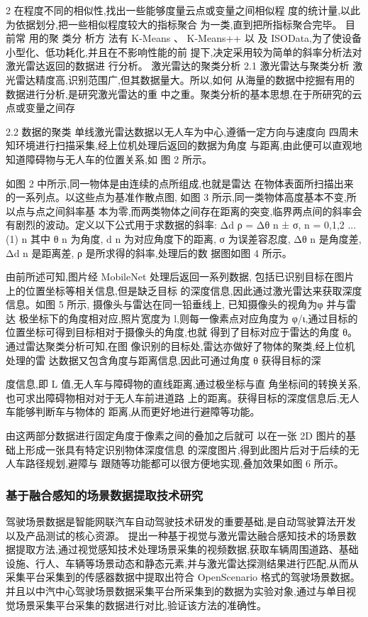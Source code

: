 \message{ !name(\unexpanded{数据融合}.tex)}\documentclass{amsart}
\begin{document}
2
在程度不同的相似性,找出一些能够度量云点或变量之间相似程
度的统计量,以此为依据划分,把一些相似程度较大的指标聚合
为一类,直到把所指标聚合完毕。
目 前常 用的聚 类分 析方 法有 K-Means 、 K-Means++ 以 及
ISOData,为了使设备小型化、低功耗化,并且在不影响性能的前
提下,决定采用较为简单的斜率分析法对激光雷达返回的数据进
行分析。
激光雷达的聚类分析
2.1 激光雷达与聚类分析
激光雷达精度高,识别范围广,但其数据量大。所以,如何
从海量的数据中挖掘有用的数据进行分析,是研究激光雷达的重
中之重。聚类分析的基本思想,在于所研究的云点或变量之间存

2.2 数据的聚类
单线激光雷达数据以无人车为中心,遵循一定方向与速度向
四周未知环境进行扫描采集,经上位机处理后返回的数据为角度
与距离,由此便可以直观地知道障碍物与无人车的位置关系,如
图 2 所示。

如图 2 中所示,同一物体是由连续的点所组成,也就是雷达
在物体表面所扫描出来的一系列点。以这些点为基准作散点图,
如图 3 所示,同一类物体高度基本不变,所以点与点之间斜率基
本为零,而两类物体之间存在距离的突变,临界两点间的斜率会
有剧烈的波动。定义以下公式用于求数据的斜率:
Δd
ρ = Δθ n ± σ, n = 0,1,2 ...
(1)
n
其中 θ n 为角度, d n 为对应角度下的距离, σ 为误差容忍度,
Δθ n 是角度差, Δd n 是距离差, ρ 是所求得的斜率,处理后的数
据图如图 4 所示。

由前所述可知,图片经 MobileNet 处理后返回一系列数据,
包括已识别目标在图片上的位置坐标等相关信息,但是缺乏目标
的深度信息,因此通过激光雷达来获取深度信息。如图 5 所示,
摄像头与雷达在同一铅垂线上,
已知摄像头的视角为φ 并与雷达
极坐标下的角度相对应,照片宽度为 l,则每一像素点对应角度为
φ/ι,通过目标的位置坐标可得到目标相对于摄像头的角度,也就
得到了目标对应于雷达的角度 θ。通过雷达聚类分析可知,在图
像识别的目标处,雷达亦做好了物体的聚类,经上位机处理的雷
达数据又包含角度与距离信息,因此可通过角度 θ 获得目标的深

度信息,即 L 值,无人车与障碍物的直线距离,通过极坐标与直
角坐标间的转换关系,也可求出障碍物相对对于无人车前进道路
上的距离。获得目标的深度信息后,无人车能够判断车与物体的
距离,从而更好地进行避障等功能。

由这两部分数据进行固定角度于像素之间的叠加之后就可
以在一张 2D 图片的基础上形成一张具有特定识别物体深度信息
的深度图片,得到此图片后对于后续的无人车路径规划,避障与
跟随等功能都可以很方便地实现,叠加效果如图 6 所示。

\subsubsection{基于融合感知的场景数据提取技术研究}
\cite{李英勃}驾驶场景数据是智能网联汽车自动驾驶技术研发的重要基础,是自动驾驶算法开发以及产品测试的核心资源。
提出一种基于视觉与激光雷达融合感知技术的场景数据提取方法,通过视觉感知技术处理场景采集的视频数据,获取车辆周围道路、基础设施、行人、车辆等场景动态和静态元素,并与激光雷达探测结果进行匹配,从而从采集平台采集到的传感器数据中提取出符合 OpenScenario 格式的驾驶场景数据。
并且以中汽中心驾驶场景数据采集平台所采集到的数据为实验对象,通过与单目视觉场景采集平台采集的数据进行对比,验证该方法的准确性。
\end{document}
